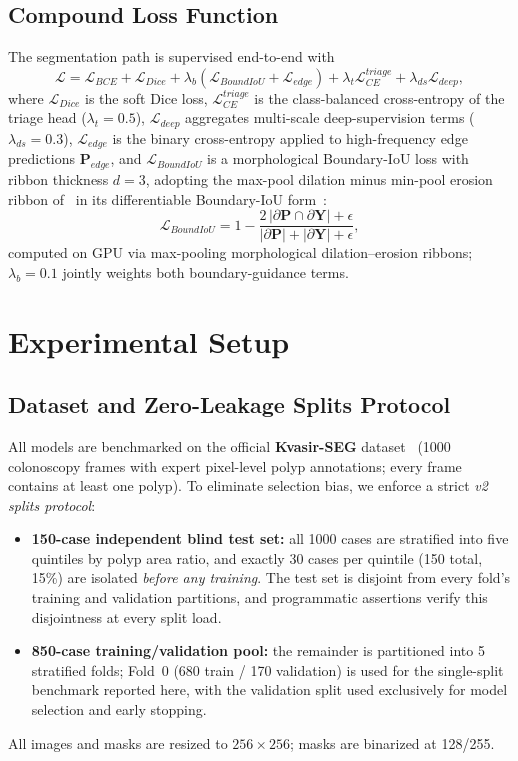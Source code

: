 \documentclass[journal]{IEEEtran}
\begin{document}
\subsection{Compound Loss Function}
\label{ssec:loss}
The segmentation path is supervised end-to-end with
\begin{equation}
    \mathcal{L} = \mathcal{L}_{BCE} + \mathcal{L}_{Dice} + \lambda_b \left( \mathcal{L}_{BoundIoU} + \mathcal{L}_{edge} \right) + \lambda_t \mathcal{L}_{CE}^{triage} + \lambda_{ds} \mathcal{L}_{deep},
\end{equation}
where $\mathcal{L}_{Dice}$ is the soft Dice loss, $\mathcal{L}_{CE}^{triage}$ is the class-balanced cross-entropy of the triage head ($\lambda_t{=}0.5$), $\mathcal{L}_{deep}$ aggregates multi-scale deep-supervision terms ($\lambda_{ds}{=}0.3$), $\mathcal{L}_{edge}$ is the binary cross-entropy applied to high-frequency edge predictions $\mathbf{P}_{edge}$, and $\mathcal{L}_{BoundIoU}$ is a morphological Boundary-IoU loss with ribbon thickness $d{=}3$, adopting the max-pool dilation minus min-pool erosion ribbon of~\cite{eljurdi2021perimeter} in its differentiable Boundary-IoU form~\cite{karimi2022boundaryiou}:
\begin{equation}
    \mathcal{L}_{BoundIoU} = 1 - \frac{2\,|\partial\mathbf{P} \cap \partial\mathbf{Y}| + \epsilon}{|\partial\mathbf{P}| + |\partial\mathbf{Y}| + \epsilon},
\end{equation}
computed on GPU via max-pooling morphological dilation--erosion ribbons; $\lambda_b = 0.1$ jointly weights both boundary-guidance terms.

\section{Experimental Setup}
\subsection{Dataset and Zero-Leakage Splits Protocol}
All models are benchmarked on the official \textbf{Kvasir-SEG} dataset~\cite{jha2020kvasir} (1000 colonoscopy frames with expert pixel-level polyp annotations; every frame contains at least one polyp). To eliminate selection bias, we enforce a strict \emph{v2 splits protocol}:
\begin{itemize}
    \item \textbf{150-case independent blind test set:} all 1000 cases are stratified into five quintiles by polyp area ratio, and exactly 30 cases per quintile (150 total, 15\%) are isolated \emph{before any training}. The test set is disjoint from every fold's training and validation partitions, and programmatic assertions verify this disjointness at every split load.
    \item \textbf{850-case training/validation pool:} the remainder is partitioned into 5 stratified folds; Fold~0 (680 train / 170 validation) is used for the single-split benchmark reported here, with the validation split used exclusively for model selection and early stopping.
\end{itemize}
All images and masks are resized to $256 \times 256$; masks are binarized at 128/255.
\end{document}
